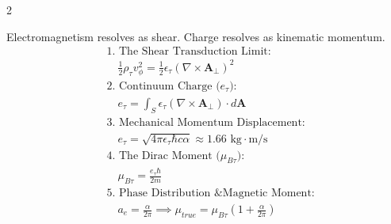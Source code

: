 \begin{multicols}{2}
\begin{tcolorbox}[cheatbox, title={\refstepcounter{cheatnum}\label{box:kinematic_charge}\thecheatnum. Kinematic Origin of Charge \& $g-2$ \hfill\makebox[0pt][r]{\scriptsize\hyperref[sec:deriv_kinematic_charge]{[Proof $\downarrow$]}}}]
Electromagnetism resolves as shear. Charge resolves as kinematic momentum.
\begin{align}
    &\text{1. The Shear Transduction Limit:} \nonumber \\
    &\quad \frac{1}{2}\rho_{\tau} v_\phi^2 = \frac{1}{2}\epsilon_{\tau} (\nabla \times \mathbf{A}_{\perp})^2 \label{eq:shear_transduction_limit} \\
    &\text{2. Continuum Charge ($e_{\tau}$):} \nonumber \\
    &\quad e_{\tau} = \int_S \epsilon_{\tau} (\nabla \times \mathbf{A}_{\perp}) \cdot d\mathbf{A} \label{eq:charge_displacement} \\
    &\text{3. Mechanical Momentum Displacement:} \nonumber \\
    &\quad e_{\tau} = \sqrt{4\pi \epsilon_{\tau} \hbar c \alpha} \approx 1.66 \text{ kg}\cdot\text{m/s} \label{eq:absolute_charge_derived} \\
    &\text{4. The Dirac Moment ($\mu_{B\tau}$):} \nonumber \\
    &\quad \mu_{B\tau} = \frac{e_{\tau} \hbar}{2m} \label{eq:bohr_magneton} \\
    &\text{5. Phase Distribution \& Magnetic Moment:} \nonumber \\
    &\quad a_e = \frac{\alpha}{2\pi} \implies \mu_{true} = \mu_{B\tau} \left( 1 + \frac{\alpha}{2\pi} \right) \label{eq:true_magnetic_moment}
\end{align}
\end{tcolorbox}


\end{multicols}
